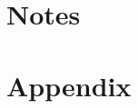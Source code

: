 \documentclass[11pt,a4paper,oneside]{report}
\begin{document}
\newpage

\section{Notes}
\label{sec:notes}



\section{Appendix}



%

%
\end{document}

